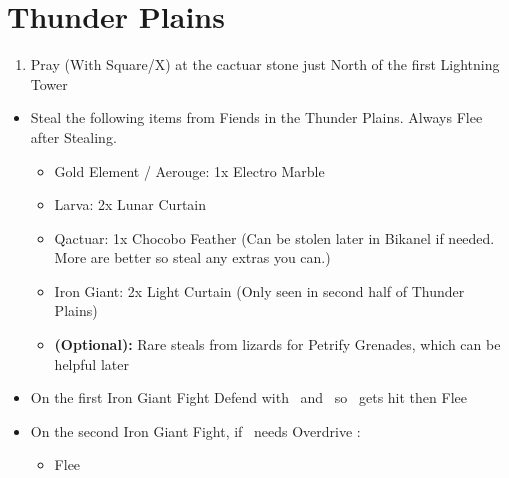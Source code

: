 \chapter{Thunder Plains}
\begin{enumerate}
	\item Pray (With Square/X) at the cactuar stone just North of the first Lightning Tower
\end{enumerate}
\begin{encounters}
	\begin{itemize}
		\item Steal the following items from Fiends in the Thunder Plains. Always Flee after Stealing.
		\begin{itemize}
			\item Gold Element / Aerouge: 1x Electro Marble
			\item Larva: 2x Lunar Curtain
			\item Qactuar: 1x Chocobo Feather (Can be stolen later in Bikanel if needed. More are better so steal any extras you can.)
			\item Iron Giant: 2x Light Curtain (Only seen in second half of Thunder Plains)
			\item \textbf{(Optional):} Rare steals from lizards for Petrify Grenades, which can be helpful later
		\end{itemize}
		\vspace{\baselineskip}
		\item On the first Iron Giant Fight Defend with \tidus\ and \auron\ so \rikku\ gets hit then Flee
		\vspace{\baselineskip}
		\item On the second Iron Giant Fight, if \yuna\ needs Overdrive :
			\begin{itemize}
				\switch{\rikku}{\yuna}
				\yunaf attack self
				\tidusf defend
				\switch{\auron}{\rikku}
				\rikkuf steal from Iron Giant
				\item Flee
			\end{itemize}
	\end{itemize}
\end{encounters}
